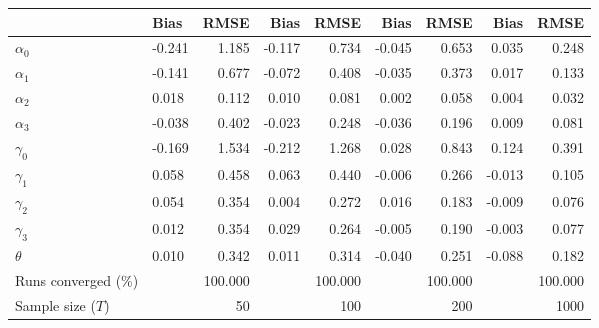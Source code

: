 
\begin{tabular}[t]{llrrrrrrr}
\toprule
  & Bias & RMSE & Bias & RMSE & Bias & RMSE & Bias & RMSE\\
\midrule
$\alpha_{0}$ & -0.241 & 1.185 & -0.117 & 0.734 & -0.045 & 0.653 & 0.035 & 0.248\\
$\alpha_{1}$ & -0.141 & 0.677 & -0.072 & 0.408 & -0.035 & 0.373 & 0.017 & 0.133\\
$\alpha_{2}$ & 0.018 & 0.112 & 0.010 & 0.081 & 0.002 & 0.058 & 0.004 & 0.032\\
$\alpha_{3}$ & -0.038 & 0.402 & -0.023 & 0.248 & -0.036 & 0.196 & 0.009 & 0.081\\
$\gamma_{0}$ & -0.169 & 1.534 & -0.212 & 1.268 & 0.028 & 0.843 & 0.124 & 0.391\\
$\gamma_{1}$ & 0.058 & 0.458 & 0.063 & 0.440 & -0.006 & 0.266 & -0.013 & 0.105\\
$\gamma_{2}$ & 0.054 & 0.354 & 0.004 & 0.272 & 0.016 & 0.183 & -0.009 & 0.076\\
$\gamma_{3}$ & 0.012 & 0.354 & 0.029 & 0.264 & -0.005 & 0.190 & -0.003 & 0.077\\
$\theta$ & 0.010 & 0.342 & 0.011 & 0.314 & -0.040 & 0.251 & -0.088 & 0.182\\
Runs converged (\%) &  & 100.000 &  & 100.000 &  & 100.000 &  & 100.000\\
Sample size ($T$) &  & 50 &  & 100 &  & 200 &  & 1000\\
\bottomrule
\end{tabular}

